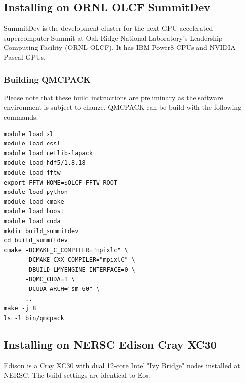\subsection{Installing on ORNL OLCF SummitDev}
SummitDev is the development cluster for the next GPU accelerated
supercomputer Summit at Oak Ridge National Laboratory's
Leadership Computing Facility  (ORNL OLCF). It has IBM Power8 CPUs and NVIDIA Pascal GPUs.

\subsubsection{Building QMCPACK}
Please note that these build instructions are preliminary as the
software environment is subject to change. QMCPACK can be build with the following commands:
\verbatimfont{\footnotesize}
\begin{verbatim}
module load xl
module load essl
module load netlib-lapack
module load hdf5/1.8.18
module load fftw
export FFTW_HOME=$OLCF_FFTW_ROOT
module load python
module load cmake
module load boost
module load cuda
mkdir build_summitdev
cd build_summitdev
cmake -DCMAKE_C_COMPILER="mpixlc" \
      -DCMAKE_CXX_COMPILER="mpixlC" \
      -DBUILD_LMYENGINE_INTERFACE=0 \
      -DQMC_CUDA=1 \
      -DCUDA_ARCH="sm_60" \
      ..
make -j 8
ls -l bin/qmcpack
\end{verbatim}

\subsection{Installing on NERSC Edison Cray XC30}

Edison is a Cray XC30 with dual 12-core Intel "Ivy Bridge" nodes
installed at NERSC. The build settings are identical to Eos.

